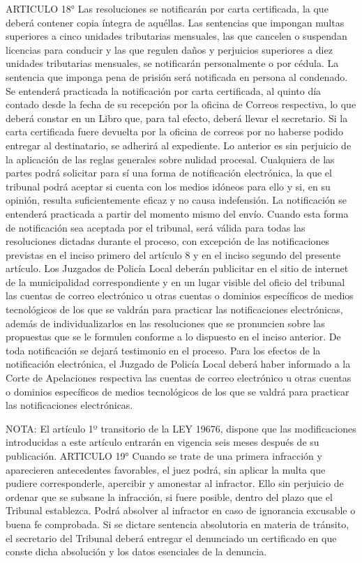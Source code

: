     ARTICULO 18° Las resoluciones se notificarán por carta certificada, la que deberá contener copia íntegra de aquéllas. Las sentencias que impongan multas superiores a cinco unidades tributarias mensuales, las que cancelen o suspendan licencias para conducir y las que regulen daños y perjuicios superiores a diez unidades tributarias mensuales, se notificarán personalmente o por cédula.
    La sentencia que imponga pena de prisión será notificada en persona al condenado.
    Se entenderá practicada la notificación por carta certificada, al quinto día contado desde la fecha de su recepción por la oficina de Correos respectiva, lo que deberá constar en un Libro que, para tal efecto, deberá llevar el secretario. Si la carta certificada fuere devuelta por la oficina de correos por no haberse podido entregar al destinatario, se adherirá al expediente. Lo anterior es sin perjuicio de la aplicación de las reglas generales sobre nulidad procesal.
    Cualquiera de las partes podrá solicitar para sí una forma de notificación electrónica, la que el tribunal podrá aceptar si cuenta con los medios idóneos para ello y si, en su opinión, resulta suficientemente eficaz y no causa indefensión. La notificación se entenderá practicada a partir del momento mismo del envío. Cuando esta forma de notificación sea aceptada por el tribunal, será válida para todas las resoluciones dictadas durante el proceso, con excepción de las notificaciones previstas en el inciso primero del artículo 8 y en el inciso segundo del presente artículo.
    Los Juzgados de Policía Local deberán publicitar en el sitio de internet de la municipalidad correspondiente y en un lugar visible del oficio del tribunal las cuentas de correo electrónico u otras cuentas o dominios específicos de medios tecnológicos de los que se valdrán para practicar las notificaciones electrónicas, además de individualizarlos en las resoluciones que se pronuncien sobre las propuestas que se le formulen conforme a lo dispuesto en el inciso anterior.   
    De toda notificación se dejará testimonio en el proceso.
    Para los efectos de la notificación electrónica, el Juzgado de Policía Local deberá haber informado a la Corte de Apelaciones respectiva las cuentas de correo electrónico u otras cuentas o dominios específicos de medios tecnológicos de los que se valdrá para practicar las notificaciones electrónicas.



NOTA:
    El artículo 1º transitorio de la LEY 19676, dispone que las modificaciones introducidas a este artículo entrarán en vigencia seis meses después de su publicación.
    ARTICULO 19° Cuando se trate de una primera infracción y aparecieren antecedentes favorables, el juez podrá, sin aplicar la multa que pudiere corresponderle, apercibir y amonestar al infractor. Ello sin perjuicio de ordenar que se subsane la infracción, si fuere posible, dentro del plazo que el Tribunal establezca.
    Podrá absolver al infractor en caso de ignorancia excusable o buena fe comprobada.
    Si se dictare sentencia absolutoria en materia de tránsito, el secretario del Tribunal deberá entregar el denunciado un certificado en que conste dicha absolución y los datos esenciales de la denuncia.

